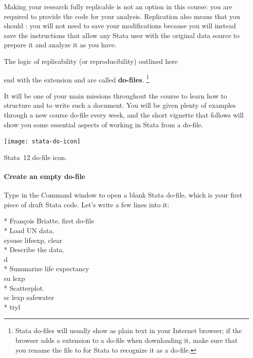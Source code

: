 Making your research fully replicable is not an option in this course: you are required to provide the code for your analysis. Replication also means that you should : you will not need to save your modifications because you will instead save the instructions that allow any Stata user with the original data source to prepare it and analyze it as you have.%

The logic of replicability (or reproducibility) outlined here 

 end with the  extension and are called \textbf{do-files}.%
	 \footnote{Stata do-files will usually show as plain text in your Internet browser; if the browser adds a  extension to a do-file when downloading it, make sure that you rename the file to  for Stata to recognize it as a do-file.} %

It will be one of your main missions throughout the course to learn how to structure and to write such a document. You will be given plenty of examples through a new course do-file every week, and the short vignette that follows will show you some essential aspects of working in Stata from a do-file.%

\begin{marginfigure}
	\texttt{[image: stata-do-icon]}
	\caption{Stata~12 do-file icon.}
	\label{fig:stata-do}
\end{marginfigure}

%
%
\paragraph{Create an empty do-file}

Type  in the Command window to open a blank Stata do-file, which is your first piece of draft Stata code. Let's write a few lines into it:%

\begin{docspec}
  * François Briatte, first do-file\\[1em]%
  * Load UN data.\\%
	sysuse lifeexp, clear\\[1em]%
	* Describe the data.\\%
	d\\[1em]%
	* Summarize life expectancy\\%
	su lexp\\[1em]%
	* Scatterplot.\\%
  sc lexp safewater\\[1em]%
	* ttyl\\
\end{docspec}

